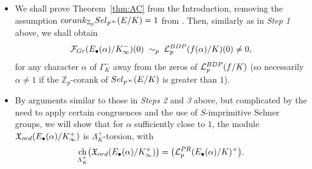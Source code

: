 \documentclass[a4paper,10pt]{amsart}
\numberwithin{equation}{section}
\numberwithin{equation}{section}
\theoremstyle{plain}
\theoremstyle{definition}
\theoremstyle{definition}
\theoremstyle{plain}
\theoremstyle{plain}
\theoremstyle{plain}
\theoremstyle{plain}
\newcommand{\Z}{\mathbb{Z}}
\newcommand{\X}{\mathfrak{X}}
\DeclareMathOperator{\ch}{ch}
\newcommand{\Lcal}{\mathcal{L}}
\newcommand{\Fcal}{\mathcal{F}}
\begin{document}
\begin{itemize}
\item We shall prove Theorem~\ref{thm:AC} from the Introduction, removing the assumption ${\rm corank}_{\Z_p}{\rm Sel}_{p^\infty}(E/K)=1$ from  \cite[Thm.~C]{eisenstein}. 
Then, %
similarly as in \emph{Step 1} above, we shall obtain
\begin{equation}\label{eq:ac-alpha}
\Fcal_{\rm Gr}(E_\bullet(\alpha)/K_\infty^-)(0)\;\sim_p\;\Lcal_p^{\rm BDP}(f(\alpha)/K)(0)\neq 0,\nonumber%
\end{equation}
for any character $\alpha$ of $\Gamma_K^-$ %
away from the zeros of $\Lcal_p^{\rm BDP}(f/K)$ (so necessarily $\alpha\neq 1$ if the $\Z_p$-corank of ${\rm Sel}_{p^\infty}(E/K)$ is greater than $1$).

\item By arguments similar to those in \emph{Steps 2} and \emph{3} above, but complicated by the need to apply certain congruences and the use of $S$-imprimitive Selmer groups, we will show that for $\alpha$ sufficiently close to $1$, the module $\X_{\rm ord}(E_\bullet(\alpha)/K_\infty^+)$ is $\Lambda_K^+$-torsion, with
\[
\ch_{\Lambda_K^+}\bigl(\X_{\rm ord}(E_\bullet(\alpha)/K_\infty^+)\bigr)=\bigl(\Lcal_p^{\rm PR}(E_\bullet(\alpha)/K)^+\bigr).
\]
%
%
\end{itemize}
\end{document}
